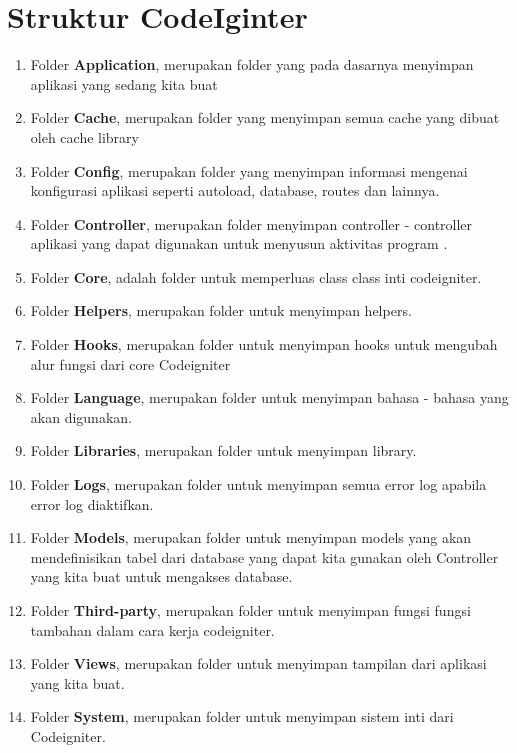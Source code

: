 \section{Struktur CodeIginter}
\begin{enumerate}
    \item Folder \textbf{Application}, merupakan folder yang pada dasarnya menyimpan aplikasi yang sedang kita buat
    \item Folder \textbf{Cache}, merupakan folder yang menyimpan semua cache yang dibuat oleh cache library
    \item Folder \textbf{Config}, merupakan folder yang menyimpan informasi mengenai konfigurasi aplikasi seperti autoload, database, routes dan lainnya.
    \item Folder \textbf{Controller}, merupakan folder menyimpan controller - controller aplikasi yang dapat digunakan untuk menyusun aktivitas program .
    \item Folder \textbf{Core}, adalah folder untuk memperluas class class inti codeigniter.
    \item Folder \textbf{Helpers}, merupakan folder untuk menyimpan helpers.
    \item Folder \textbf{Hooks}, merupakan folder untuk menyimpan hooks untuk mengubah alur fungsi dari core Codeigniter
    \item Folder \textbf{Language}, merupakan folder untuk menyimpan bahasa - bahasa yang akan digunakan.
    \item Folder \textbf{Libraries}, merupakan folder untuk menyimpan library.
    \item Folder \textbf{Logs}, merupakan folder untuk menyimpan semua error log apabila error log diaktifkan.
    \item Folder \textbf{Models}, merupakan folder untuk menyimpan models yang akan mendefinisikan tabel dari database yang dapat kita gunakan oleh Controller yang kita buat untuk mengakses database.
    \item Folder \textbf{Third-party}, merupakan folder untuk menyimpan fungsi fungsi tambahan dalam cara kerja codeigniter.
    \item Folder \textbf{Views}, merupakan folder untuk menyimpan tampilan dari aplikasi yang kita buat.
    \item Folder \textbf{System}, merupakan folder untuk menyimpan sistem inti dari Codeigniter.
\end{enumerate}

